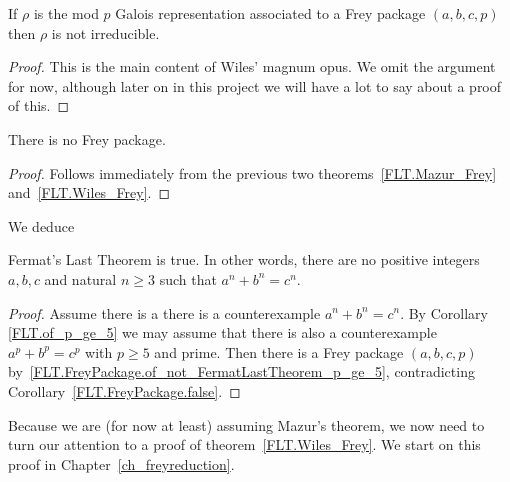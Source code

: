 \begin{theorem}
  \label{FLT.Wiles_Frey}
  \leanok
  If $\rho$ is the mod $p$ Galois representation associated to a Frey package $(a,b,c,p)$ then
  $\rho$ is not irreducible.
\end{theorem}
\begin{proof}
  This is the main content of Wiles' magnum opus.
  We omit the argument for now, although later on in this project
  we will have a lot to say about a proof of this.
\end{proof}

\begin{corollary}
  \label{FLT.FreyPackage.false}
  \leanok
  There is no Frey package.
\end{corollary}
\begin{proof}\leanok Follows immediately from the previous two
  theorems~\ref{FLT.Mazur_Frey} and~\ref{FLT.Wiles_Frey}.
\end{proof}

We deduce

\begin{corollary}
  \label{FLT}
  \leanok
  Fermat's Last Theorem is true. In other words, there are no positive integers $a,b,c$ and
  natural $n\geq3$ such that $a^n+b^n=c^n$.
\end{corollary}
\begin{proof}
  \leanok
  Assume there is a there is a counterexample $a^n+b^n=c^n$.
  By Corollary \ref{FLT.of_p_ge_5} we may assume that there is also a counterexample
  $a^p+b^p=c^p$ with $p\geq 5$ and prime.
  Then there is a Frey package $(a,b,c,p)$ by~\ref{FLT.FreyPackage.of_not_FermatLastTheorem_p_ge_5},
  contradicting Corollary~\ref{FLT.FreyPackage.false}.
\end{proof}

Because we are (for now at least) assuming Mazur's theorem, we now need to turn our attention
to a proof of theorem~\ref{FLT.Wiles_Frey}. We start on this proof in Chapter~\ref{ch_freyreduction}.
